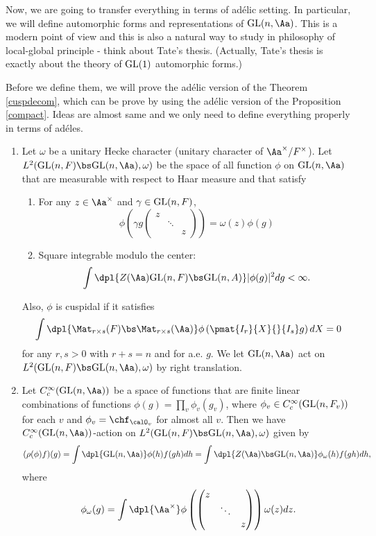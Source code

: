 Now, we are going to transfer everything in terms of ad\'elic setting. In particular, we will define automorphic forms and representations of $\GL(n, \Aa)$. 
This is a modern point of view and this is also a natural way to study in philosophy of local-global principle - think about Tate's thesis. 
(Actually, Tate's thesis is exactly about the theory of $\mathrm{GL}(1)$ automorphic forms.) 

Before we define them, we will prove the ad\'elic version of the Theorem \ref{cuspdecom}, which can be prove by using the ad\'elic version of the Proposition \ref{compact}. 
Ideas are almost same and we only need to define everything properly in terms of ad\'eles. 

\begin{definition}
\label{l2def}
\begin{enumerate}
\item
Let $\omega$ be a unitary Hecke character (unitary character of  $\Aa^{\times}/F^{\times}$). 
Let $L^{2}(\GL(n, F) \bs \GL(n, \Aa), \omega)$ be the space of all function $\phi$ on $\GL(n, \Aa)$ that are measurable with respect to Haar measure and that satisfy
\begin{enumerate}
\item For any $z\in \Aa^{\times}$ and $\gamma \in \mathrm{GL}(n, F)$, 
$$
\phi\left(\gamma g\begin{pmatrix} z & & \\ & \ddots & \\ & & z\end{pmatrix}\right) = \omega(z)\phi(g)
$$
\item Square integrable modulo the center:
$$
\int\dpl{Z(\Aa)\GL(n, F) \bs \GL(n, A)} |\phi(g)|^{2} dg < \infty. 
$$ 
\end{enumerate}
Also, $\phi$ is cuspidal if it satisfies 
$$
\int\dpl{\Mat_{r\times s}(F) \bs \Mat_{r\times s}(\Aa)} \phi\left(\pmat{I_{r}}{X}{}{I_{s}}g\right)dX = 0
$$
for any $r, s>0$ with $r + s = n$ and for a.e. $g$. 
We let $\GL(n, \Aa)$ act on $L^{2}(\GL(n, F)\bs \GL(n, \Aa), \omega)$ by right translation. 
\item Let $C_{c}^{\infty}(\GL(n, \Aa))$ be a space of functions that are finite linear combinations of functions $\phi(g) = \prod_{v} \phi_{v}(g_{v})$, where $\phi_v \in C_{c}^{\infty}(\mathrm{GL}(n, F_{v}))$ for each $v$ and $\phi_v = \chf_{\calO_{v}}$ for almost all $v$. 
Then we have $C_{c}^{\infty}(\GL(n, \Aa))$-action on $L^{2}(\GL(n, F)\bs \GL(n, \Aa), \omega)$ given by 
$$
(\rho(\phi)f)(g) = \int\dpl{\GL(n, \Aa)} \phi(h)f(gh)dh = \int\dpl{Z(\Aa)\bs \GL(n, \Aa)} \phi_{\omega}(h) f(gh)dh, 
$$
where
$$
\phi_{\omega}(g) = \int\dpl{\Aa^{\times}} \phi \left(\begin{pmatrix}z & & \\ & \ddots & \\ & & z \end{pmatrix}\right)\omega(z)dz.
$$
\end{enumerate}
\end{definition}

